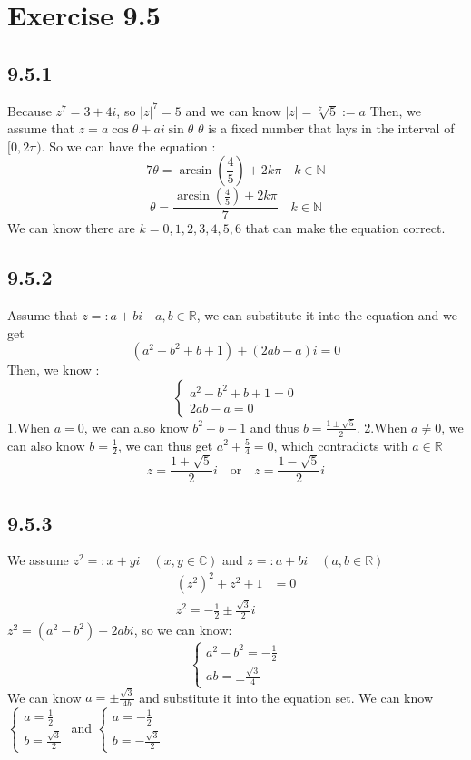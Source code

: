 \documentclass[11pt,twoside,a4paper]{article}
\begin{document}
\section{Exercise 9.5}
\subsection{9.5.1}
Because $z^7=3+4i$, so $|z|^7=5$ and we can know $|z|=\sqrt[7]{5}:=a $
Then, we assume that\newline
$z=a\cos \theta +a i \sin \theta $ $\theta $ is a fixed number that lays in
the interval of $[0,2\pi)$. So we can have the equation :
$$7\theta =\arcsin (\frac{4}{5})+2k\pi \quad k\in \mathbb{N}$$
$$\theta =\frac{\arcsin (\frac{4}{5})+2k\pi}{7} \quad k\in \mathbb{N}$$
We can know there are $k=0,1,2,3,4,5,6$ that can make the equation
correct.

\subsection{9.5.2}
Assume that $z=:a+bi\quad a,b\in \mathbb{R}$, we can substitute it into
the equation and we get 
$$(a^2-b^2+b+1)+(2ab-a)i=0$$
Then, we know :
$$
\begin{cases}
    a^2-b^2+b+1=0\\
    2ab-a=0
\end{cases}
$$
1.When $a=0$, we can also know $b^2-b-1$ and thus $\displaystyle
b=\frac{1\pm \sqrt{5}}{2}$.
\newline
2.When $a\neq 0$, we can also know $\displaystyle b=\frac{1}{2}$, we can thus get
 $\displaystyle a^2+\frac{5}{4}=0$, which contradicts with $a \in \mathbb{R}$
\newline
$$z=\frac{1+\sqrt{5}}{2} i\quad \text{or} \quad z=\frac{1-\sqrt{5}}{2}i$$

\subsection{9.5.3}
We assume $z^2=:x+yi\quad (x,y\in \mathbb{C})$ and $z=:a+bi\quad (a,b\in \mathbb{R})$
\begin{equation}
    \begin{aligned}
        (z^2)^2+z^2+1&=0\\
        z^2=-\frac{1}{2}\pm \frac{\sqrt{3}}{2}i
    \end{aligned}
\end{equation}
$z^2=(a^2-b^2)+2abi$, so we can know:
$$
\begin{cases}
    a^2-b^2=-\frac{1}{2}\\
    ab=\pm \frac{\sqrt{3}}{4}
\end{cases}
$$
We can know $\displaystyle a=\pm\frac{\sqrt{3}}{4b}$ and substitute it into the 
equation set. We can know 
$
\begin{cases}
    \displaystyle
    a=\frac{1}{2}\\
    \displaystyle
    b=\frac{\sqrt{3}}{2}
\end{cases}
$
and 
$
\begin{cases}
    \displaystyle
    a=-\frac{1}{2}\\
    \displaystyle
    b=-\frac{\sqrt{3}}{2}
\end{cases}
$
\end{document}
